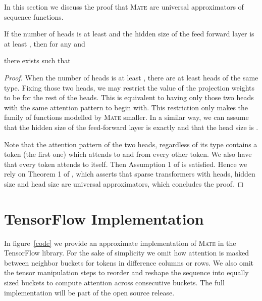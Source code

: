 \documentclass[11pt]{article}
\newcommand{\model}{\textsc{Mate}\xspace}
\begin{document}
In this section we discuss the proof that \model are universal approximators of sequence functions.

\begin{theorem*}
If the number of heads is at least  and the hidden size of the feed forward layer is at least , then for any  and 
 
there exists  such that 
\end{theorem*}

\begin{proof}
When the number of heads is at least , there are at least  heads of the same type. Fixing those two heads, we may restrict the value of the projection weights  to be  for the rest of the heads. This is equivalent to having only those two heads with the same attention pattern to begin with.
This restriction only makes the family of functions modelled by \model smaller. In a similar way, we can assume that the hidden size of the feed-forward layer is exactly  and that the head size is .

Note that the attention pattern of the two heads, regardless of its type contains a token (the first one) which attends to and from every other token. We also have that every token attends to itself. Then Assumption 1 of \citet{univapprox2020} is satisfied. 
Hence we rely on Theorem 1 of \citet{univapprox2020}, which asserts that sparse transformers with  heads, hidden size  and head size  are universal approximators, which concludes the proof.
\end{proof}

\section{TensorFlow Implementation}
\label{sec:apx-code}

In figure~\ref{code} we provide an approximate implementation of \model in the TensorFlow library. For the sake of simplicity we omit how attention is masked between neighbor buckets for tokens in difference columns or rows. We also omit the tensor manipulation steps to reorder and reshape the sequence into equally sized buckets to compute attention across consecutive buckets. The full implementation will be part of the open source release.


\end{document}
